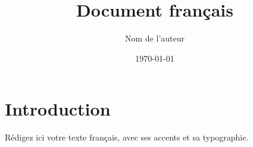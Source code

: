 \documentclass[11pt,a4paper]{article}
\title{Document français}
\author{Nom de l'auteur}
\date{\today}
\begin{document}
\maketitle
\section{Introduction}
Rédigez ici votre texte français, avec ses accents et sa typographie.
\end{document}
